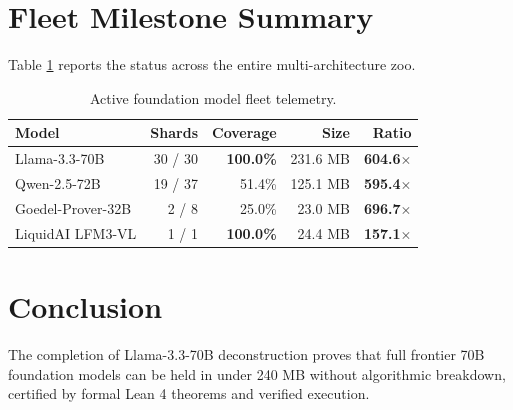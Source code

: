 \documentclass[10pt,twocolumn,letterpaper]{article}
\begin{document}
\section{Fleet Milestone Summary}
Table \ref{tab:fleet} reports the status across the entire multi-architecture zoo.

\begin{table}[h]
\centering
\small
\begin{tabular}{lrrrr}
\toprule
\textbf{Model} & \textbf{Shards} & \textbf{Coverage} & \textbf{Size} & \textbf{Ratio} \\
\midrule
Llama-3.3-70B & 30 / 30 & \textbf{100.0\%} & 231.6 MB & \textbf{604.6$\times$} \\
Qwen-2.5-72B & 19 / 37 & 51.4\% & 125.1 MB & \textbf{595.4$\times$} \\
Goedel-Prover-32B & 2 / 8 & 25.0\% & 23.0 MB & \textbf{696.7$\times$} \\
LiquidAI LFM3-VL & 1 / 1 & \textbf{100.0\%} & 24.4 MB & \textbf{157.1$\times$} \\
\bottomrule
\end{tabular}
\caption{Active foundation model fleet telemetry.}
\label{tab:fleet}
\end{table}

\section{Conclusion}
The completion of Llama-3.3-70B deconstruction proves that full frontier 70B foundation models can be held in under 240 MB without algorithmic breakdown, certified by formal Lean 4 theorems and verified execution.
\end{document}
